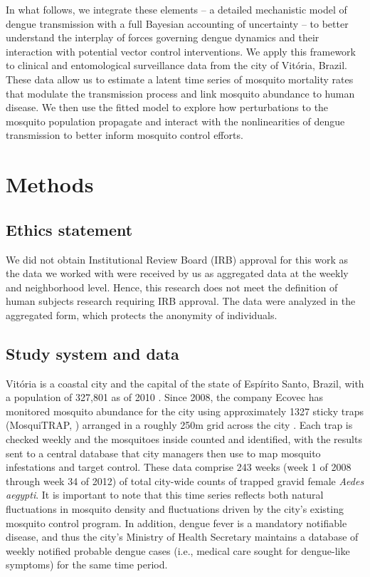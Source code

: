 \documentclass[10pt,letterpaper]{article}
\begin{document}
In what follows, we integrate these elements -- a detailed mechanistic model of dengue transmission with a full Bayesian accounting of uncertainty --  to better understand the interplay of forces governing dengue dynamics and their interaction with potential vector control interventions.
We apply this framework to clinical and entomological surveillance data from the city of Vit\'oria, Brazil.
These data allow us to estimate a latent time series of mosquito mortality rates that modulate the transmission process and link mosquito abundance to human disease.  
We then use the fitted model to explore how perturbations to the mosquito population propagate and interact with the nonlinearities of dengue transmission to better inform mosquito control efforts.

\section*{Methods}

\subsection*{Ethics statement}

We did not obtain Institutional Review Board (IRB) approval for this work as the data we worked with were received by us as aggregated data at the weekly and neighborhood level.  
Hence, this research does not meet the definition of human subjects research requiring IRB approval.  
The data were analyzed in the aggregated form, which protects the anonymity of individuals.

\subsection*{Study system and data}

Vit\'oria is a coastal city and the capital of the state of Esp\'irito Santo, Brazil, with a population of 327,801 as of 2010 \cite{vitpop}.
Since 2008, the company Ecovec has monitored mosquito abundance for the city using approximately 1327 sticky traps (MosquiTRAP, \cite{Eiras2009}) arranged in a roughly 250m grid across the city \cite{Pepin2015, Lana2018}.
Each trap is checked weekly and the mosquitoes inside counted and identified, with the results sent to a central database that city managers then use to map mosquito infestations and target control.
These data comprise 243 weeks (week 1 of 2008 through week 34 of 2012) of total city-wide counts of trapped gravid female \emph{Aedes aegypti}.
It is important to note that this time series reflects both natural fluctuations in mosquito density and fluctuations driven by the city's existing mosquito control program.
In addition, dengue fever is a mandatory notifiable disease, and thus the city's Ministry of Health Secretary maintains a database of weekly notified probable dengue cases (i.e., medical care sought for dengue-like symptoms) for the same time period.
\end{document}

